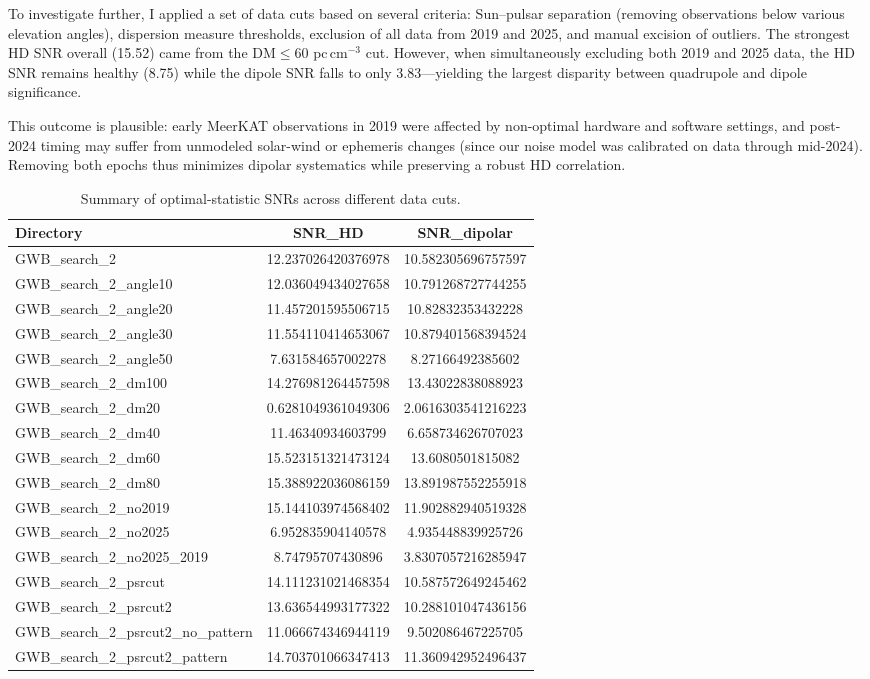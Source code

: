 \documentclass[12pt,a4paper]{article}
\begin{document}
To investigate further, I applied a set of data cuts based on several criteria: Sun--pulsar separation (removing observations below various elevation angles), dispersion measure thresholds, exclusion of all data from 2019 and 2025, and manual excision of outliers. The strongest HD SNR overall (15.52) came from the DM\(\leq\)60 pc\,cm\(^{-3}\) cut. However, when simultaneously excluding both 2019 and 2025 data, the HD SNR remains healthy (8.75) while the dipole SNR falls to only 3.83---yielding the largest disparity between quadrupole and dipole significance.

This outcome is plausible: early MeerKAT observations in 2019 were affected by non-optimal hardware and software settings, and post-2024 timing may suffer from unmodeled solar-wind or ephemeris changes (since our noise model was calibrated on data through mid-2024). Removing both epochs thus minimizes dipolar systematics while preserving a robust HD correlation.

\begin{table}[H]
\centering
\begin{tabular}{lcc}
\toprule
Directory & SNR\_HD & SNR\_dipolar \\
\midrule
GWB\_search\_2 & 12.237026420376978 & 10.582305696757597 \\
GWB\_search\_2\_angle10 & 12.036049434027658 & 10.791268727744255 \\
GWB\_search\_2\_angle20 & 11.457201595506715 & 10.82832353432228 \\
GWB\_search\_2\_angle30 & 11.554110414653067 & 10.879401568394524 \\
GWB\_search\_2\_angle50 & 7.631584657002278 & 8.27166492385602 \\
GWB\_search\_2\_dm100 & 14.276981264457598 & 13.43022838088923 \\
GWB\_search\_2\_dm20 & 0.6281049361049306 & 2.0616303541216223 \\
GWB\_search\_2\_dm40 & 11.46340934603799 & 6.658734626707023 \\
GWB\_search\_2\_dm60 & 15.523151321473124 & 13.6080501815082 \\
GWB\_search\_2\_dm80 & 15.388922036086159 & 13.891987552255918 \\
GWB\_search\_2\_no2019 & 15.144103974568402 & 11.902882940519328 \\
GWB\_search\_2\_no2025 & 6.952835904140578 & 4.935448839925726 \\
GWB\_search\_2\_no2025\_2019 & 8.74795707430896 & 3.8307057216285947 \\
GWB\_search\_2\_psrcut & 14.111231021468354 & 10.587572649245462 \\
GWB\_search\_2\_psrcut2 & 13.636544993177322 & 10.288101047436156 \\
GWB\_search\_2\_psrcut2\_no\_pattern & 11.066674346944119 & 9.502086467225705 \\
GWB\_search\_2\_psrcut2\_pattern & 14.703701066347413 & 11.360942952496437 \\
\bottomrule
\end{tabular}
\caption{Summary of optimal-statistic SNRs across different data cuts.}
\end{table}
\end{document}
